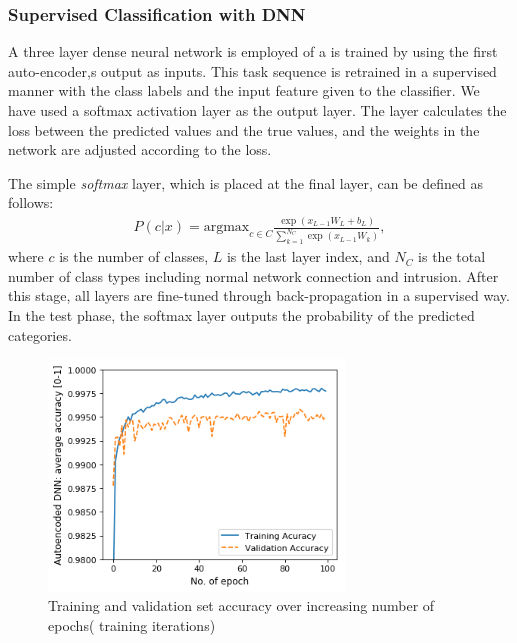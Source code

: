 \documentclass[runningheads]{llncs}
\begin{document}
\subsubsection{ Supervised Classification with DNN}
A three layer dense neural network is employed of a  is trained by using the first auto-encoder,s output as inputs. This task sequence is retrained in a supervised manner with the class labels and the input feature given to the classifier. We have used a softmax activation layer as the output layer. The layer calculates the loss between the predicted values and the true values, and the weights in the network are adjusted according to the loss. 

The simple \emph{softmax} layer, which is placed at the final layer, can be defined as follows:
\begin{align}\label{eq3}
P\left( {c |x} \right) = {\text{argmax}}_{c \in C} \frac{{{ \exp }(x_{L - 1} W_{L} + b_{L} )}}{{\mathop \sum \nolimits_{k = 1}^{{N_{C} }} { \exp }(x_{L - 1} W_{k} )}},
\end{align}
where   $c$  is the number of classes,   $L$  is the last layer index, and $N_{C}$ is the total number of class types including normal network connection and intrusion.
After this stage, all layers are fine-tuned through back-propagation in a supervised way. In the test phase, the softmax layer outputs the probability of the predicted categories. 


 \begin{figure}
      \centering
\includegraphics[width=0.7\textwidth]{Figures/Autoencode_DNN.png}
\caption{ Training and validation set accuracy over increasing number of epochs( training iterations) }
      \label{fig:accuracy}
    \end{figure}
\end{document}

